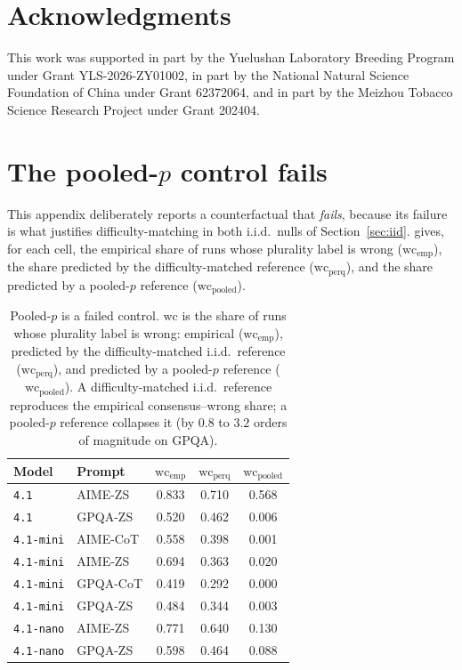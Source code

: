 \documentclass{article}
\begin{document}
\section*{Acknowledgments}
This work was supported in part by the Yuelushan Laboratory Breeding
Program under Grant YLS-2026-ZY01002, in part by the National Natural
Science Foundation of China under Grant 62372064, and in part by the
Meizhou Tobacco Science Research Project under Grant 202404.




\clearpage
\appendix

\section{The pooled-$p$ control fails}
\label{app:pooled}

This appendix deliberately reports a counterfactual that \emph{fails}, because its
failure is what justifies difficulty-matching in both i.i.d.\ nulls of
Section~\ref{sec:iid}.  gives, for each
cell, the empirical share of runs whose plurality label is wrong
($\mathrm{wc}_{\mathrm{emp}}$), the share predicted by the
difficulty-matched reference ($\mathrm{wc}_{\mathrm{perq}}$), and the
share predicted by a pooled-$p$ reference
($\mathrm{wc}_{\mathrm{pooled}}$).

\begin{table}[H]
\centering
\caption{Pooled-$p$ is a failed control. $\mathrm{wc}$ is the share of runs whose plurality label is wrong: empirical ($\mathrm{wc}_{\mathrm{emp}}$), predicted by the difficulty-matched i.i.d.\ reference ($\mathrm{wc}_{\mathrm{perq}}$), and predicted by a pooled-$p$ reference ($\mathrm{wc}_{\mathrm{pooled}}$). A difficulty-matched i.i.d.\
reference reproduces the empirical consensus--wrong share; a pooled-$p$
reference collapses it (by $0.8$ to $3.2$ orders of magnitude on GPQA).}
\label{tab:pooled}
\begin{tabular}{llccc}
\toprule
Model & Prompt & $\mathrm{wc}_{\mathrm{emp}}$ &
$\mathrm{wc}_{\mathrm{perq}}$ & $\mathrm{wc}_{\mathrm{pooled}}$ \\
\midrule
\texttt{4.1} & AIME-ZS & 0.833 & 0.710 & 0.568 \\
\texttt{4.1} & GPQA-ZS & 0.520 & 0.462 & 0.006 \\
\texttt{4.1-mini} & AIME-CoT & 0.558 & 0.398 & 0.001 \\
\texttt{4.1-mini} & AIME-ZS & 0.694 & 0.363 & 0.020 \\
\texttt{4.1-mini} & GPQA-CoT & 0.419 & 0.292 & 0.000 \\
\texttt{4.1-mini} & GPQA-ZS & 0.484 & 0.344 & 0.003 \\
\texttt{4.1-nano} & AIME-ZS & 0.771 & 0.640 & 0.130 \\
\texttt{4.1-nano} & GPQA-ZS & 0.598 & 0.464 & 0.088 \\
\bottomrule
\end{tabular}
\end{table}
\end{document}
